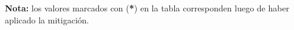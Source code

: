 	
	\textbf{Nota: }los valores marcados con (\textbf{*}) en la tabla corresponden luego de haber aplicado la mitigación.
	


% 
%
%
%
%
%
%
